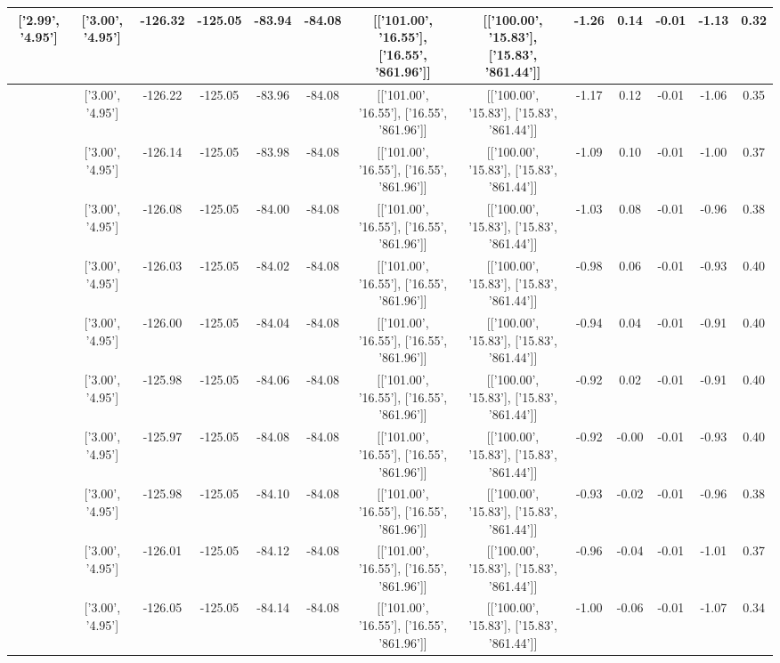 \begin{table}[htbp]
\begin{adjustbox}{angle=90}
\begin{tabular}{|c|c|c|c|c|c|c|c|c|c|c|c|c|}
 ['2.99', '4.95'] & ['3.00', '4.95'] & -126.32 & -125.05 & -83.94 & -84.08 & [['101.00', '16.55'], ['16.55', '861.96']] & [['100.00', '15.83'], ['15.83', '861.44']] & -1.26 & 0.14 & -0.01 & -1.13 & 0.32\\ \hline
 ['2.99', '4.95'] & ['3.00', '4.95'] & -126.22 & -125.05 & -83.96 & -84.08 & [['101.00', '16.55'], ['16.55', '861.96']] & [['100.00', '15.83'], ['15.83', '861.44']] & -1.17 & 0.12 & -0.01 & -1.06 & 0.35\\ \hline
 ['2.99', '4.95'] & ['3.00', '4.95'] & -126.14 & -125.05 & -83.98 & -84.08 & [['101.00', '16.55'], ['16.55', '861.96']] & [['100.00', '15.83'], ['15.83', '861.44']] & -1.09 & 0.10 & -0.01 & -1.00 & 0.37\\ \hline
 ['3.00', '4.95'] & ['3.00', '4.95'] & -126.08 & -125.05 & -84.00 & -84.08 & [['101.00', '16.55'], ['16.55', '861.96']] & [['100.00', '15.83'], ['15.83', '861.44']] & -1.03 & 0.08 & -0.01 & -0.96 & 0.38\\ \hline
 ['3.00', '4.95'] & ['3.00', '4.95'] & -126.03 & -125.05 & -84.02 & -84.08 & [['101.00', '16.55'], ['16.55', '861.96']] & [['100.00', '15.83'], ['15.83', '861.44']] & -0.98 & 0.06 & -0.01 & -0.93 & 0.40\\ \hline
 ['3.00', '4.95'] & ['3.00', '4.95'] & -126.00 & -125.05 & -84.04 & -84.08 & [['101.00', '16.55'], ['16.55', '861.96']] & [['100.00', '15.83'], ['15.83', '861.44']] & -0.94 & 0.04 & -0.01 & -0.91 & 0.40\\ \hline
 ['3.00', '4.95'] & ['3.00', '4.95'] & -125.98 & -125.05 & -84.06 & -84.08 & [['101.00', '16.55'], ['16.55', '861.96']] & [['100.00', '15.83'], ['15.83', '861.44']] & -0.92 & 0.02 & -0.01 & -0.91 & 0.40\\ \hline
 ['3.00', '4.95'] & ['3.00', '4.95'] & -125.97 & -125.05 & -84.08 & -84.08 & [['101.00', '16.55'], ['16.55', '861.96']] & [['100.00', '15.83'], ['15.83', '861.44']] & -0.92 & -0.00 & -0.01 & -0.93 & 0.40\\ \hline
 ['3.00', '4.95'] & ['3.00', '4.95'] & -125.98 & -125.05 & -84.10 & -84.08 & [['101.00', '16.55'], ['16.55', '861.96']] & [['100.00', '15.83'], ['15.83', '861.44']] & -0.93 & -0.02 & -0.01 & -0.96 & 0.38\\ \hline
 ['3.00', '4.95'] & ['3.00', '4.95'] & -126.01 & -125.05 & -84.12 & -84.08 & [['101.00', '16.55'], ['16.55', '861.96']] & [['100.00', '15.83'], ['15.83', '861.44']] & -0.96 & -0.04 & -0.01 & -1.01 & 0.37\\ \hline
 ['3.00', '4.95'] & ['3.00', '4.95'] & -126.05 & -125.05 & -84.14 & -84.08 & [['101.00', '16.55'], ['16.55', '861.96']] & [['100.00', '15.83'], ['15.83', '861.44']] & -1.00 & -0.06 & -0.01 & -1.07 & 0.34\\ \hline

\end{tabular}
\end{adjustbox}
\end{table}
